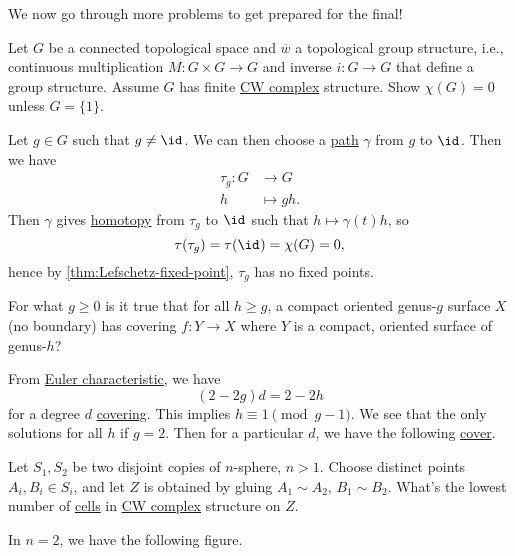 We now go through more problems to get prepared for the final!
\begin{exercise}[QR Jan. 2021]
	Let \(G\) be a connected topological space and \(\overline{w} \) a topological group structure, i.e., continuous multiplication
	\(M\colon G\times G \to G\) and inverse \(i\colon G\to G\) that define a group structure. Assume \(G\) has finite \hyperref[def:CW-Complex]{CW complex}
	structure. Show \(\chi (G) = 0\) unless \(G = \{1\}\).
\end{exercise}
\begin{answer}
	Let \(g\in G\) such that \(g \neq \id_{} \). We can then choose a \hyperref[def:path]{path} \(\gamma \) from \(g\) to \(\id_{} \).
	Then we have
	\[
		\begin{split}
			\tau _g\colon G &\to G\\
			h &\mapsto gh.
		\end{split}
	\]
	Then \(\gamma \) gives \hyperref[def:homotopy]{homotopy} from \(\tau _g\) to \(\id_{} \) such that \(h \mapsto \gamma (t) h\),
	so
	\[
		\tau (\tau _{g} )= \tau (\id_{} )= \chi (G) = 0,
	\]
	hence by \autoref{thm:Lefschetz-fixed-point}, \(\tau _g\) has no fixed points.
\end{answer}

\begin{exercise}[QR May.\ 2019]
	For what \(g \geq 0\) is it true that for all \(h \geq g\), a compact oriented genus-\(g\) surface \(X\) (no boundary)
	has covering \(f\colon Y\to X\) where \(Y\) is a compact, oriented surface of genus-\(h\)?
\end{exercise}
\begin{answer}
	From \hyperref[def:Euler-characteristic]{Euler characteristic}, we have
	\[
		(2 - 2g) d = 2 - 2h
	\]
	for a degree \(d\) \hyperref[def:covering-space]{covering}. This implies \(h \equiv 1\pmod {g-1}\). We see that the only solutions
	for all \(h\) if \(g = 2\). Then for a particular \(d\), we have the following \hyperref[def:covering-space]{cover}.
	\begin{figure}[H]
		\centering
		\label{fig:lec-41-2}
	\end{figure}
\end{answer}

\begin{exercise}[QR Jan. 2019]
	Let \(S_1, S_2\) be two disjoint  copies of \(n\)-sphere, \(n>1\). Choose distinct points \(A_{i} , B_{i} \in S_{i} \), and let
	\(Z\) is obtained by gluing \(A_1\sim A_2\), \(B_1\sim B_2\). What's the lowest number of \hyperref[def:cell]{cells} in
	\hyperref[def:CW-Complex]{CW complex} structure on \(Z\).
\end{exercise}
\begin{answer}
	In \(n=2\), we have the following figure.
	\begin{figure}[H]
		\centering
		\label{fig:lec-41-3}
	\end{figure}
\end{answer}


